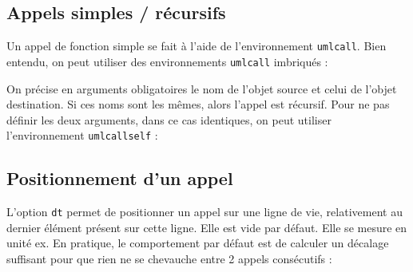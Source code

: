 \documentclass[a4paper,11pt]{report}
\newcommand{\inputTikZ}[1]{%
  }%
\newcommand{\inputTikZ}[1]{%
    \texttt{[image: fig/\#1.pdf]}%
  }%
\begin{document}
\subsection{Appels simples / récursifs}\label{ss.call}

Un appel de fonction simple se fait à l'aide de l'environnement {\tt umlcall}. Bien entendu, on peut utiliser des environnements {\tt umlcall} imbriqués :

\medskip

\begin{minipage}{0.4\textwidth}

\end{minipage}
\begin{minipage}{0.6\textwidth}
\begin{center}
\inputTikZ{figure68}
\end{center}
\end{minipage}

\medskip

On précise en arguments obligatoires le nom de l'objet source et celui de l'objet destination.
Si ces noms sont les mêmes, alors l'appel est récursif. Pour ne pas définir les deux arguments, dans ce cas identiques, on peut utiliser l'environnement {\tt umlcallself} :

\medskip

\begin{minipage}{0.5\textwidth}

\end{minipage}
\begin{minipage}{0.5\textwidth}
\begin{center}
\inputTikZ{figure69}
\end{center}
\end{minipage}

\subsection{Positionnement d'un appel}\label{ss.calldt}

L'option {\tt dt} permet de positionner un appel sur une ligne de vie, relativement au dernier élément présent sur cette ligne. Elle est vide par défaut. Elle se mesure en unité ex. En pratique, le comportement par défaut est de calculer un décalage suffisant pour que rien ne se chevauche entre 2 appels consécutifs :

\medskip

\begin{minipage}{0.5\textwidth}

\end{minipage}
\begin{minipage}{0.5\textwidth}
\begin{center}
\inputTikZ{figure70}
\end{center}
\end{minipage}
\end{document}
